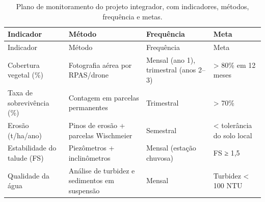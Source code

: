 \documentclass[
  portuguese,
  11pt,
  a4paper,
  open=any]{scrbook}
\begin{document}
\begin{longtable}[]{@{}
  >{\raggedright\arraybackslash}p{}
  >{\raggedright\arraybackslash}p{}
  >{\raggedright\arraybackslash}p{}
  >{\raggedright\arraybackslash}p{}@{}}
\caption{Plano de monitoramento do projeto integrador, com indicadores,
métodos, frequência e metas.}\label{tbl-monitoramento}\tabularnewline
\toprule\noalign{}
\begin{minipage}[b]{\linewidth}\raggedright
Indicador
\end{minipage} & \begin{minipage}[b]{\linewidth}\raggedright
Método
\end{minipage} & \begin{minipage}[b]{\linewidth}\raggedright
Frequência
\end{minipage} & \begin{minipage}[b]{\linewidth}\raggedright
Meta
\end{minipage} \\
\midrule\noalign{}
\endfirsthead
\toprule\noalign{}
\begin{minipage}[b]{\linewidth}\raggedright
Indicador
\end{minipage} & \begin{minipage}[b]{\linewidth}\raggedright
Método
\end{minipage} & \begin{minipage}[b]{\linewidth}\raggedright
Frequência
\end{minipage} & \begin{minipage}[b]{\linewidth}\raggedright
Meta
\end{minipage} \\
\midrule\noalign{}
\endhead
\bottomrule\noalign{}
\endlastfoot
Cobertura vegetal (\%) & Fotografia aérea por RPAS/drone & Mensal (ano
1), trimestral (anos 2--3) & \textgreater{} 80\% em 12 meses \\
Taxa de sobrevivência (\%) & Contagem em parcelas permanentes &
Trimestral & \textgreater{} 70\% \\
Erosão (t/ha/ano) & Pinos de erosão + parcelas Wischmeier & Semestral &
\textless{} tolerância do solo local \\
Estabilidade do talude (FS) & Piezômetros + inclinômetros & Mensal
(estação chuvosa) & FS ≥ 1,5 \\
Qualidade da água & Análise de turbidez e sedimentos em suspensão &
Mensal & Turbidez \textless{} 100 NTU \\
\end{longtable}
\end{document}
